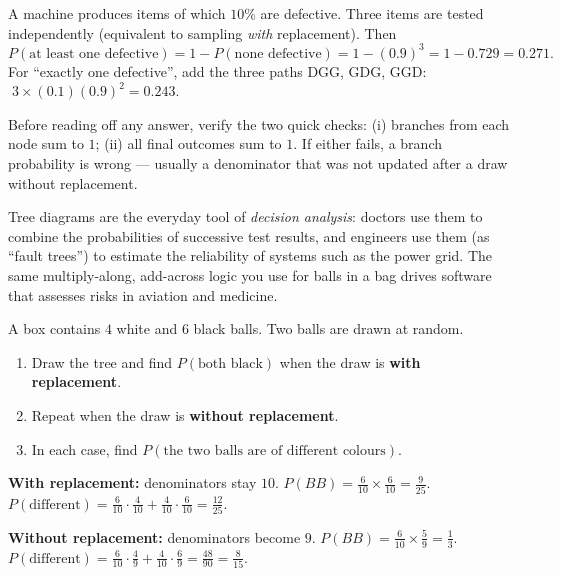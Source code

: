 \documentclass[11pt]{article}
\begin{document}
\begin{exemplebox}
A machine produces items of which $10\%$ are defective. Three items are tested independently (equivalent to sampling \emph{with} replacement). Then
\[ P(\text{at least one defective})=1-P(\text{none defective})=1-(0.9)^3=1-0.729=0.271. \]
For ``exactly one defective'', add the three paths DGG, GDG, GGD: $\;3\times(0.1)(0.9)^2=0.243$.
\end{exemplebox}

\begin{attention}
Before reading off any answer, verify the two quick checks: (i) branches from each node sum to $1$; (ii) all final outcomes sum to $1$. If either fails, a branch probability is wrong — usually a denominator that was not updated after a draw without replacement.
\end{attention}

\begin{savaistu}
Tree diagrams are the everyday tool of \emph{decision analysis}: doctors use them to combine the probabilities of successive test results, and engineers use them (as ``fault trees'') to estimate the reliability of systems such as the power grid. The same multiply-along, add-across logic you use for balls in a bag drives software that assesses risks in aviation and medicine.
\end{savaistu}

\begin{exercice}
A box contains $4$ white and $6$ black balls. Two balls are drawn at random.
\begin{enumerate}
\item Draw the tree and find $P(\text{both black})$ when the draw is \textbf{with replacement}.
\item Repeat when the draw is \textbf{without replacement}.
\item In each case, find $P(\text{the two balls are of different colours})$.
\end{enumerate}
\end{exercice}

\begin{corrige}[Exercise 1]
\textbf{With replacement:} denominators stay $10$.
$P(BB)=\tfrac{6}{10}\times\tfrac{6}{10}=\tfrac{9}{25}$.
$P(\text{different})=\tfrac{6}{10}\cdot\tfrac{4}{10}+\tfrac{4}{10}\cdot\tfrac{6}{10}=\tfrac{12}{25}$.

\textbf{Without replacement:} denominators become $9$.
$P(BB)=\tfrac{6}{10}\times\tfrac{5}{9}=\tfrac{1}{3}$.
$P(\text{different})=\tfrac{6}{10}\cdot\tfrac{4}{9}+\tfrac{4}{10}\cdot\tfrac{6}{9}=\tfrac{48}{90}=\tfrac{8}{15}$.
\end{corrige}
\end{document}
